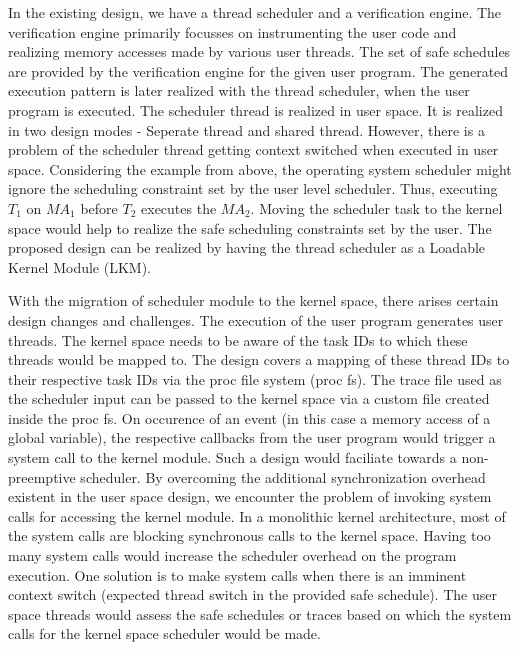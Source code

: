 \documentclass[12pt]{article}
\begin{document}
In the existing design, we have a thread scheduler and a verification engine.  
The verification engine primarily focusses on instrumenting the user code and realizing memory accesses made by various user threads. 
The set of safe schedules are provided by the verification engine for the given user program. 
The generated execution pattern is later realized with the thread scheduler, when the user program is executed. 
The scheduler thread is realized in user space. 
It is realized in two design modes - Seperate thread and shared thread. 
However, there is a problem of the scheduler thread getting context switched when executed in user space. 
Considering the example from above, the operating system scheduler might ignore the scheduling constraint set by the user level scheduler. 
Thus, executing $T_{1}$ on $MA_{1}$ before $T_{2}$ executes the $MA_{2}$. 
Moving the scheduler task to the kernel space would help to realize the safe scheduling constraints set by the user. 
The proposed design can be realized by having the thread scheduler as a Loadable Kernel Module (LKM). 

With the migration of scheduler module to the kernel space, there arises certain design changes and challenges. 
The execution of the user program generates user threads. 
The kernel space needs to be aware of the task IDs to which these threads would be mapped to. 
The design covers a mapping of these thread IDs to their respective task IDs via the proc file system (proc fs). 
The trace file used as the scheduler input can be passed to the kernel space via a custom file created inside the proc fs. 
On occurence of an event (in this case a memory access of a global variable), the respective callbacks from the user program would trigger a system call to the kernel module. 
Such a design would faciliate towards a non-preemptive scheduler. 
By overcoming the additional synchronization overhead existent in the user space design, we encounter the problem of invoking system calls for accessing the kernel module. 
In a monolithic kernel architecture, most of the system calls are blocking synchronous calls to the kernel space. 
Having too many system calls would increase the scheduler overhead on the program execution. 
One solution is to make system calls when there is an imminent context switch (expected thread switch in the provided safe schedule). 
The user space threads would assess the safe schedules or traces based on which the system calls for the kernel space scheduler would be made. 
\end{document}
